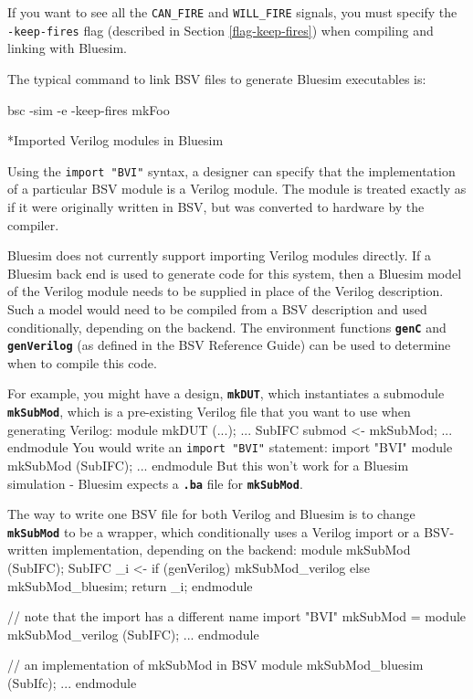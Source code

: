 \documentclass{article}
\makeatletter
\newcommand{\te}[1]{\texttt{#1}}
\newenvironment{centerboxverbatim}
  {\center
   \boxedverbatim}
  {\endboxedverbatim
  {\endcenter }}
\def\subsubsubsection{\@startsection {subsubsubsection}{4}{\z@}{-3ex plus -1ex minus -.2ex}{1.25ex plus .2ex}{\normalsize\bf}*}
\makeatother
\begin{document}
If you want to see all the \te{CAN\_FIRE} and \te{WILL\_FIRE} signals,
you must specify the \te{-keep-fires} flag (described in Section
\ref{flag-keep-fires})  when compiling and linking
with Bluesim.

The typical command to link  BSV files to generate    Bluesim
executables is:

\begin{centerboxverbatim}
bsc -sim -e -keep-fires mkFoo
\end{centerboxverbatim}


\subsubsubsection{Imported Verilog modules in Bluesim}
\label{importV-bluesim}

Using the \te{import "BVI"} syntax, a designer can specify that the
implementation of a particular BSV module is a Verilog module.  The
module is treated exactly as if it were originally written in BSV, but
was converted to hardware by the compiler.

Bluesim does not currently support importing Verilog modules
directly.  If a Bluesim back end is used to generate code for this
system,  then a
Bluesim model of the Verilog module  needs to be supplied in place
of the Verilog description.  Such a model would need to be compiled from a
BSV description and used conditionally, depending on the backend.  The
 environment
functions {\bf\tt genC} and {\bf\tt genVerilog} (as defined in the BSV
Reference Guide) can be used to determine when to compile this code.

For example, you might have a design, {\bf\tt mkDUT}, which
instantiates a submodule {\bf\tt mkSubMod}, which is a pre-existing
Verilog  file that you want to use when generating Verilog:
\begin{centerboxverbatim}
module mkDUT (...);
   ...
   SubIFC submod <- mkSubMod;
   ...
endmodule
\end{centerboxverbatim}
You would write an \te{import "BVI"} statement:
\begin{centerboxverbatim}
  import "BVI" module mkSubMod (SubIFC); ... endmodule
\end{centerboxverbatim}
But this won't work for a Bluesim simulation - Bluesim
expects a {\bf\tt .ba} file for {\bf\tt mkSubMod}.

The way to write one BSV file for both Verilog and Bluesim is to
change {\bf\tt mkSubMod} to be a wrapper, which conditionally uses a
Verilog  import or a BSV-written implementation, depending on the backend:
\begin{centerboxverbatim}
module mkSubMod (SubIFC);
   SubIFC _i <- if (genVerilog)
                   mkSubMod_verilog
                else
                   mkSubMod_bluesim;
   return _i;
endmodule

// note that the import has a different name
import "BVI" mkSubMod =
    module mkSubMod_verilog (SubIFC); ... endmodule

// an implementation of mkSubMod in BSV
module mkSubMod_bluesim (SubIfc);
   ...
endmodule
\end{centerboxverbatim}
\end{document}

